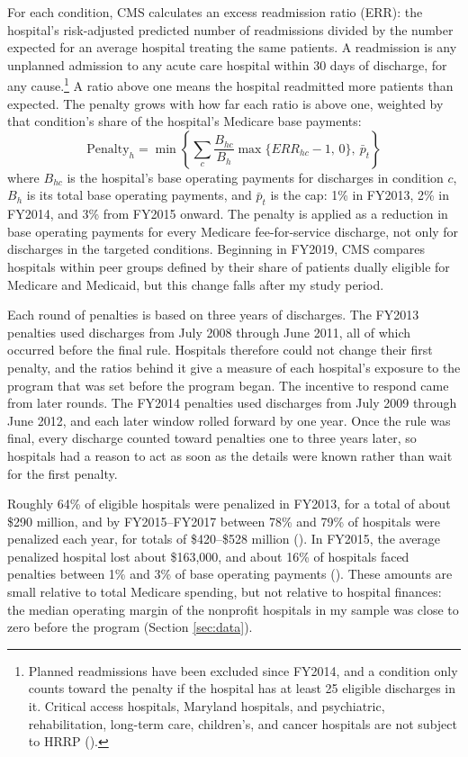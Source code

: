 \documentclass[12pt]{article}
\theoremstyle{definition}   %
\begin{document}
    For each condition, CMS calculates an excess readmission ratio (ERR): the hospital's risk-adjusted predicted number of readmissions divided by the number expected for an average hospital treating the same patients. A readmission is any unplanned admission to any acute care hospital within 30 days of discharge, for any cause.\footnote{Planned readmissions have been excluded since FY2014, and a condition only counts toward the penalty if the hospital has at least 25 eligible discharges in it. Critical access hospitals, Maryland hospitals, and psychiatric, rehabilitation, long-term care, children's, and cancer hospitals are not subject to HRRP (\cite{kff_hrrp}).} A ratio above one means the hospital readmitted more patients than expected. The penalty grows with how far each ratio is above one, weighted by that condition's share of the hospital's Medicare base payments:
    \begin{equation}
        \text{Penalty}_{h} = \min\left\{ \sum_{c} \frac{B_{hc}}{B_{h}} \max\{ERR_{hc} - 1,\, 0\},\ \bar{p}_{t} \right\}
    \end{equation}
    where $B_{hc}$ is the hospital's base operating payments for discharges in condition $c$, $B_{h}$ is its total base operating payments, and $\bar{p}_{t}$ is the cap: 1\% in FY2013, 2\% in FY2014, and 3\% from FY2015 onward. The penalty is applied as a reduction in base operating payments for every Medicare fee-for-service discharge, not only for discharges in the targeted conditions. Beginning in FY2019, CMS compares hospitals within peer groups defined by their share of patients dually eligible for Medicare and Medicaid, but this change falls after my study period.

    Each round of penalties is based on three years of discharges. The FY2013 penalties used discharges from July 2008 through June 2011, all of which occurred before the final rule. Hospitals therefore could not change their first penalty, and the ratios behind it give a measure of each hospital's exposure to the program that was set before the program began. The incentive to respond came from later rounds. The FY2014 penalties used discharges from July 2009 through June 2012, and each later window rolled forward by one year. Once the rule was final, every discharge counted toward penalties one to three years later, so hospitals had a reason to act as soon as the details were known rather than wait for the first penalty.

    Roughly 64\% of eligible hospitals were penalized in FY2013, for a total of about \$290 million, and by FY2015--FY2017 between 78\% and 79\% of hospitals were penalized each year, for totals of \$420--\$528 million (\cite{kff_hrrp}). In FY2015, the average penalized hospital lost about \$163,000, and about 16\% of hospitals faced penalties between 1\% and 3\% of base operating payments (\cite{medpac_2015}). These amounts are small relative to total Medicare spending, but not relative to hospital finances: the median operating margin of the nonprofit hospitals in my sample was close to zero before the program (Section \ref{sec:data}).
\end{document}
